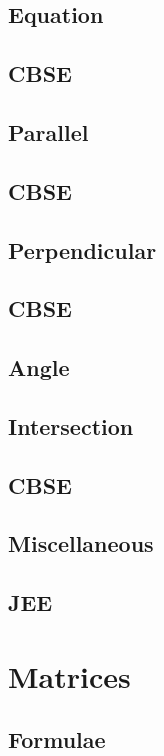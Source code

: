 \documentclass[journal]{IEEEtran}
\begin{document}
\subsection{Equation }

\subsection{CBSE}

\subsection{Parallel}

\subsection{CBSE}

\subsection{Perpendicular}

\subsection{CBSE}

\subsection{Angle}

\subsection{Intersection}

\subsection{CBSE}

\subsection{Miscellaneous }

\subsection{JEE}

\newpage
\section{Matrices}
\subsection{Formulae}

\end{document}
